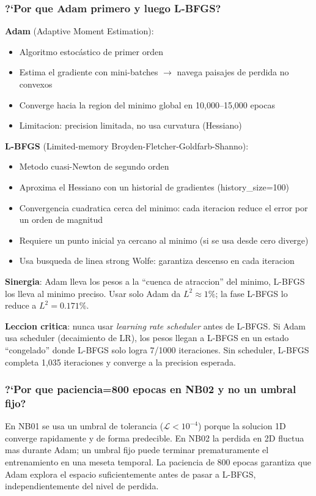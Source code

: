 \subsubsection*{?`Por que Adam primero y luego L-BFGS?}
\begin{tcolorbox}[colback=gray!5, colframe=ujatgray, breakable]
\textbf{Adam} (Adaptive Moment Estimation):
\begin{itemize}
  \item Algoritmo estocástico de primer orden
  \item Estima el gradiente con mini-batches $\to$ navega paisajes de perdida no convexos
  \item Converge hacia la region del minimo global en 10,000--15,000 epocas
  \item Limitacion: precision limitada, no usa curvatura (Hessiano)
\end{itemize}

\textbf{L-BFGS} (Limited-memory Broyden-Fletcher-Goldfarb-Shanno):
\begin{itemize}
  \item Metodo cuasi-Newton de segundo orden
  \item Aproxima el Hessiano con un historial de gradientes (history\_size=100)
  \item Convergencia cuadratica cerca del minimo: cada iteracion reduce el error
        por un orden de magnitud
  \item Requiere un punto inicial ya cercano al minimo (si se usa desde cero diverge)
  \item Usa busqueda de linea strong Wolfe: garantiza descenso en cada iteracion
\end{itemize}

\textbf{Sinergia}: Adam lleva los pesos a la ``cuenca de atraccion'' del minimo,
L-BFGS los lleva al minimo preciso. Usar solo Adam da $L^2 \approx 1\%$; la fase
L-BFGS lo reduce a $L^2 = 0.171\%$.

\textbf{Leccion critica}: nunca usar \emph{learning rate scheduler} antes de L-BFGS.
Si Adam usa scheduler (decaimiento de LR), los pesos llegan a L-BFGS en un estado
``congelado'' donde L-BFGS solo logra 7/1000 iteraciones. Sin scheduler, L-BFGS
completa 1,035 iteraciones y converge a la precision esperada.
\end{tcolorbox}

\subsubsection*{?`Por que paciencia=800 epocas en NB02 y no un umbral fijo?}
\begin{tcolorbox}[colback=gray!5, colframe=ujatgray, breakable]
En NB01 se usa un umbral de tolerancia ($\mathcal{L} < 10^{-4}$) porque la solucion
1D converge rapidamente y de forma predecible. En NB02 la perdida en 2D fluctua mas
durante Adam; un umbral fijo puede terminar prematuramente el entrenamiento en una
meseta temporal. La paciencia de 800 epocas garantiza que Adam explora el espacio
suficientemente antes de pasar a L-BFGS, independientemente del nivel de perdida.
\end{tcolorbox}

